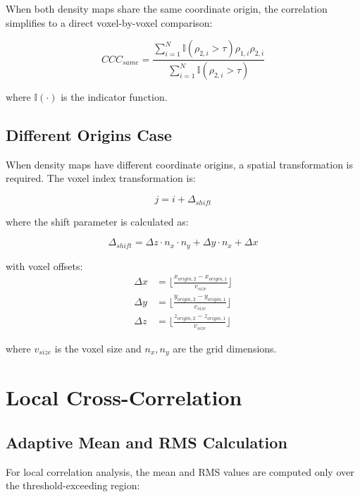\documentclass[12pt,a4paper]{article}
\begin{document}
When both density maps share the same coordinate origin, the 
correlation simplifies to a direct voxel-by-voxel comparison:

\begin{equation}
CCC_{same} = \frac{\sum_{i=1}^{N} \mathbb{I}(\rho_{2,i} > \tau) \rho_{1,i} \rho_{2,i}}{\sum_{i=1}^{N} \mathbb{I}(\rho_{2,i} > \tau)}
\end{equation}

where $\mathbb{I}(\cdot)$ is the indicator function.

\subsection{Different Origins Case}

When density maps have different coordinate origins, a spatial 
transformation is required. The voxel index transformation is:

\begin{equation}
j = i + \Delta_{shift}
\end{equation}

where the shift parameter is calculated as:

\begin{equation}
\Delta_{shift} = \Delta z \cdot n_x \cdot n_y + \Delta y \cdot n_x + \Delta x
\end{equation}

with voxel offsets:
\begin{align}
\Delta x &= \lfloor \frac{x_{origin,2} - x_{origin,1}}{v_{size}} \rfloor \\
\Delta y &= \lfloor \frac{y_{origin,2} - y_{origin,1}}{v_{size}} \rfloor \\
\Delta z &= \lfloor \frac{z_{origin,2} - z_{origin,1}}{v_{size}} \rfloor
\end{align}

where $v_{size}$ is the voxel size and $n_x, n_y$ are the grid dimensions.

\section{Local Cross-Correlation}

\subsection{Adaptive Mean and RMS Calculation}

For local correlation analysis, the mean and RMS values are 
computed only over the threshold-exceeding region:
\end{document}

